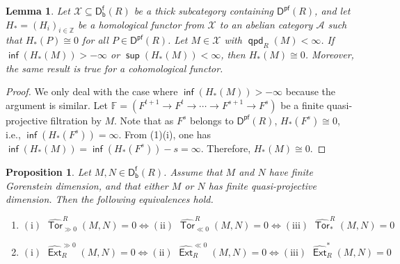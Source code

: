 \documentclass[10pt, a4paper,reqno]{amsart}
\newtheorem{lem}[lem]{Lemma}
\newtheorem{prop}[prop]{Proposition}
\theoremstyle{definition}
\theoremstyle{remark}
\numberwithin{equation}{thm}
\def\FF{\mathbb{F}}
\def\ZZ{\mathbb{Z}}
\def\cA{\mathcal{A}}
\def\cX{\mathcal{X}}
\def\Ext{\operatorname{\mathsf{Ext}}}
\def\Tor{\operatorname{\mathsf{Tor}}}
\def\Dfb{\mathsf{D^f_b}}
\def\Pf{\mathsf{D^{pf}}}
\def\sup{\operatorname{\mathsf{sup}}}
\def\inf{\operatorname{\mathsf{inf}}}
\def\qpd{\operatorname{\mathsf{qpd}}}
\begin{document}
\begin{lem}\label{lemst}
Let $\cX \subseteq \Dfb(R)$ be a thick subcategory containing $\Pf(R)$, and let $H_* = (H_i)_{i \in \ZZ}$ be a homological functor from $\cX$ to an abelian category $\cA$ such that $H_*(P) \cong 0$ for all $P \in \Pf(R)$. 
Let $M \in \cX$ with $\qpd_R(M) < \infty$.
If $\inf(H_*(M)) > -\infty$ or $\sup(H_*(M)) < \infty$, then $H_*(M) \cong 0$.
Moreover, the same result is true for a cohomological functor.
\end{lem}

\begin{proof}
We only deal with the case where $\inf(H_*(M)) > -\infty$ because the argument is similar.
Let $\FF = (F^{t+1} \to F^t \to \cdots \to F^{s+1} \to F^s)$ be a finite quasi-projective filtration by $M$.
Note that as $F^s$ belongs to $\Pf(R)$, $H_*(F^s) \cong 0$, i.e., $\inf(H_*(F^s)) = \infty$.
From (1)(i), one has $\inf(H_*(M)) = \inf(H_*(F^s)) - s = \infty$.
Therefore, $H_*(M) \cong 0$.
\end{proof}



\begin{prop}\label{tatevan}
Let $M,N\in\Dfb(R)$.  
Assume that $M$ and $N$ have finite Gorenstein dimension, and that either $M$ or $N$ has finite quasi-projective dimension.
Then the following equivalences hold.
\begin{enumerate}[\rm(1)]
\item	
$\mathrm{(i)}\,\, \widehat{\Tor}_{\gg0}^R(M,N)=0
\Longleftrightarrow
\mathrm{(ii)}\,\,\widehat{\Tor}_{\ll0}^R(M,N)=0
\Longleftrightarrow
\mathrm{(iii)}\,\, \widehat{\Tor}_*^R(M,N)=0$

\item
$\mathrm{(i)}\,\, \widehat{\Ext}_R^{\gg0}(M,N)=0
\Longleftrightarrow
\mathrm{(ii)}\,\, \widehat{\Ext}_R^{\ll0}(M,N)=0
\Longleftrightarrow
\mathrm{(iii)}\,\, \widehat{\Ext}_R^*(M,N)=0$
\end{enumerate}
\end{prop}
\end{document}
